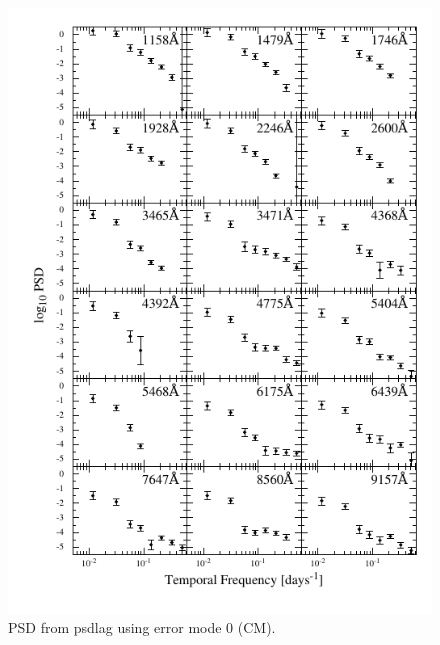 \documentclass[11pt,letterpaper]{article}
\begin{document}
\begin{figure}
    \label{fig:psd_err0}
    \centering
    \includegraphics{../img/psd_atlas_err0.pdf}
    \caption{PSD from psdlag using error mode 0 (CM).}
\end{figure}
\end{document}
